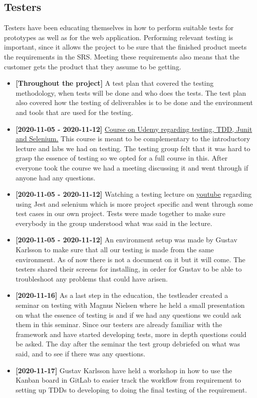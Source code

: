 \subsection{Testers}
Testers have been educating themselves in how to perform suitable tests for prototypes as well as for the web application. Performing relevant testing is important, since it allows the project to be sure that the finished product meets the requirements in the SRS. Meeting these requirements also means that the customer gets the product that they assume to be getting.
\begin{itemize}
  \item \textbf{[Throughout the project]} A test plan that covered the testing methodology, when tests will be done and who does the tests. The test plan also covered how the testing of deliverables is to be done and the environment and tools that are used for the testing. 
    \item \textbf{[2020-11-05 - 2020-11-12]} \href{(https://www.udemy.com/course/what-a-java-software-developer-must-know-about-testing/)} {Course on Udemy regarding testing, TDD, Junit and Selenium.} This course is meant to be complementary to the introductory lecture and labs we had on testing. The testing group felt that it was hard to grasp the essence of testing so we opted for a full course in this. After everyone took the course we had a meeting discussing it and went through if anyone had any questions. 
    \item \textbf{[2020-11-05 - 2020-11-12]} Watching a testing lecture on  \href{(https://www.youtube.com/watch?v=mRW2E8uweEc)}{youtube} regarding using Jest and selenium which is more project specific and went through some test cases in our own project. Tests were made together to make sure everybody in the group understood what was said in the lecture. 
    \item \textbf{[2020-11-05 - 2020-11-12]} An environment setup was made by Gustav Karlsson to make sure that all our testing is made from the same environment. As of now there is not a document on it but it will come. The testers shared their screens for installing, in order for Gustav to be able to troubleshoot any problems that could have arisen. 
    \item \textbf{[2020-11-16]} As a last step in the education, the testleader created a seminar on testing with Magnus Nielsen where he held a small presentation on what the essence of testing is and if we had any questions we could ask them in this seminar. Since our testers are already familiar with the framework and have started developing tests, more in depth questions could be asked. The day after the seminar the test group debriefed on what was said, and to see if there was any questions. 
        \item \textbf{[2020-11-17]} Gustav Karlsson have held a workshop in how to use the Kanban board in GitLab to easier track the workflow from requirement to setting up TDDs to developing to doing the final testing of the requirement. 
\end{itemize}

